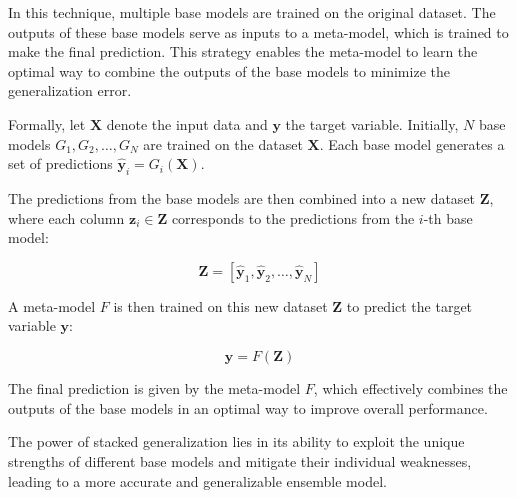 In this technique, multiple base models are trained on the original dataset. 
The outputs of these base models serve as inputs to a meta-model, which is trained to make the final prediction.
This strategy enables the meta-model to learn the optimal way to combine the outputs of the base models to minimize the generalization error.

Formally, let $\mathbf{X}$ denote the input data and $\mathbf{y}$ the target variable.
Initially, $N$ base models $G_1, G_2, \ldots, G_N$ are trained on the dataset $\mathbf{X}$.
Each base model generates a set of predictions $\hat{\mathbf{y}}_i = G_i(\mathbf{X})$.

The predictions from the base models are then combined into a new dataset $\mathbf{Z}$, where each column $\mathbf{z}_i \in \mathbf{Z}$ corresponds to the predictions from the $i$-th base model:

$$
\mathbf{Z} = [\hat{\mathbf{y}}_1, \hat{\mathbf{y}}_2, \ldots, \hat{\mathbf{y}}_N]
$$

A meta-model $F$ is then trained on this new dataset $\mathbf{Z}$ to predict the target variable $\mathbf{y}$:

$$
\mathbf{\hat{y}} = F(\mathbf{Z})
$$

The final prediction is given by the meta-model $F$, which effectively combines the outputs of the base models in an optimal way to improve overall performance. 

The power of stacked generalization lies in its ability to exploit the unique strengths of different base models and mitigate their individual weaknesses, leading to a more accurate and generalizable ensemble model.